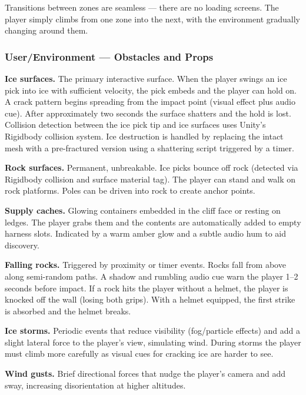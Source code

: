 \documentclass[12pt]{article}
\begin{document}
Transitions between zones are seamless --- there are no loading screens. The player simply climbs from one zone into the next, with the environment gradually changing around them.


\subsubsection{User/Environment --- Obstacles and Props}

\textbf{Ice surfaces.} The primary interactive surface. When the player swings an ice pick into ice with sufficient velocity, the pick embeds and the player can hold on. A crack pattern begins spreading from the impact point (visual effect plus audio cue). After approximately two seconds the surface shatters and the hold is lost. Collision detection between the ice pick tip and ice surfaces uses Unity's Rigidbody collision system. Ice destruction is handled by replacing the intact mesh with a pre-fractured version using a shattering script triggered by a timer.

\textbf{Rock surfaces.} Permanent, unbreakable. Ice picks bounce off rock (detected via Rigidbody collision and surface material tag). The player can stand and walk on rock platforms. Poles can be driven into rock to create anchor points.

\textbf{Supply caches.} Glowing containers embedded in the cliff face or resting on ledges. The player grabs them and the contents are automatically added to empty harness slots. Indicated by a warm amber glow and a subtle audio hum to aid discovery.

\textbf{Falling rocks.} Triggered by proximity or timer events. Rocks fall from above along semi-random paths. A shadow and rumbling audio cue warn the player 1--2 seconds before impact. If a rock hits the player without a helmet, the player is knocked off the wall (losing both grips). With a helmet equipped, the first strike is absorbed and the helmet breaks.

\textbf{Ice storms.} Periodic events that reduce visibility (fog/particle effects) and add a slight lateral force to the player's view, simulating wind. During storms the player must climb more carefully as visual cues for cracking ice are harder to see.

\textbf{Wind gusts.} Brief directional forces that nudge the player's camera and add sway, increasing disorientation at higher altitudes.
\end{document}
